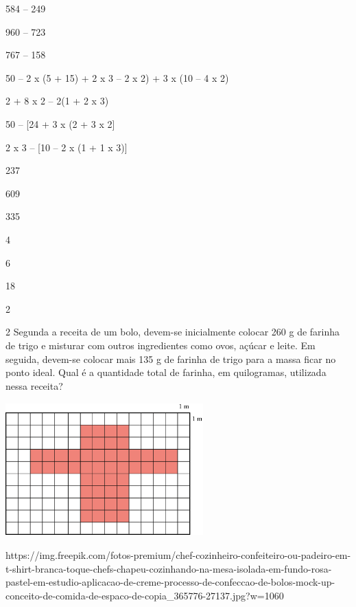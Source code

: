 \begin{multicols}{2}
584 -- 249

960 -- 723

767 -- 158

50 -- 2 x (5 + 15) + 2 x 3 -- 2 x 2) + 3 x (10 -- 4 x 2)

2 + 8 x 2 -- 2(1 + 2 x 3)

50 -- {[}24 + 3 x (2 + 3 x 2{]}

2 x 3 -- {[}10 -- 2 x (1 + 1 x 3){]}

\columnbreak

237

609

335

4

6

18

2
\end{multicols}

\begin{mdframed}[linewidth=2pt,linecolor=salmao,roundcorner=2pt]
\vspace{10cm}
\end{mdframed}

\num{2} Segunda a receita de um bolo, devem-se inicialmente colocar 260 g de farinha
de trigo e misturar com outros ingredientes como ovos, açúcar e leite.
Em seguida, devem-se colocar mais 135 g de farinha de trigo para a massa
ficar no ponto ideal. Qual é a quantidade total de farinha, em quilogramas,
utilizada nessa receita?

\includegraphics[width=3.00000in,height=2.02528in]{media/image32.png}


https://img.freepik.com/fotos-premium/chef-cozinheiro-confeiteiro-ou-padeiro-em-t-shirt-branca-toque-chefs-chapeu-cozinhando-na-mesa-isolada-em-fundo-rosa-pastel-em-estudio-aplicacao-de-creme-processo-de-confeccao-de-bolos-mock-up-conceito-de-comida-de-espaco-de-copia\_365776-27137.jpg?w=1060

\begin{mdframed}[linewidth=2pt,linecolor=salmao,roundcorner=2pt]
\vspace{3cm}
\end{mdframed}

